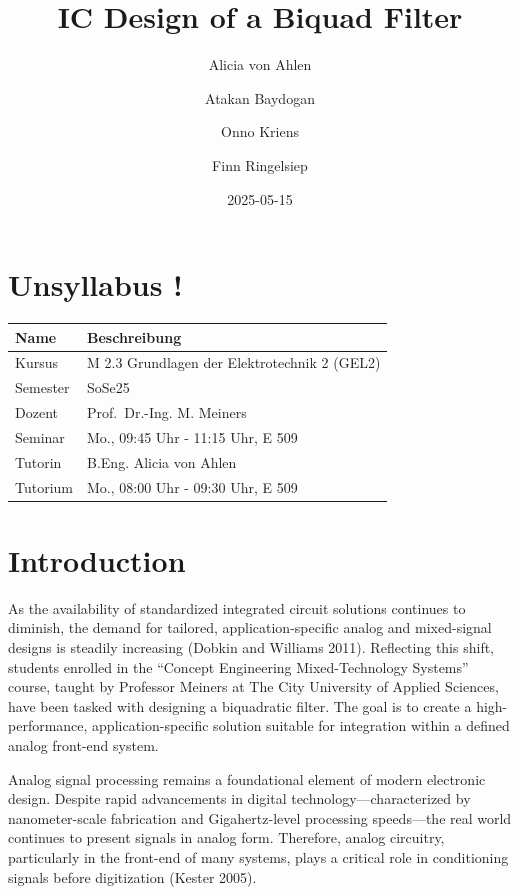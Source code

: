 \documentclass[
  english,
]{scrbook}
\title{IC Design of a Biquad Filter}
\author{Alicia von Ahlen \and Atakan Baydogan \and Onno Kriens \and Finn
Ringelsiep}
\date{2025-05-15}
\renewcommand*\contentsname{Table of contents}
\newcommand\contentsname{Table of contents}
\begin{document}
\frontmatter
\maketitle

\renewcommand*\contentsname{Table of contents}
{
\hypersetup{linkcolor=}
\setcounter{tocdepth}{2}
\tableofcontents
}

\mainmatter
\chapter{Unsyllabus !}\label{unsyllabus}

\begin{longtable}[]{@{}ll@{}}
\toprule\noalign{}
Name & Beschreibung \\
\midrule\noalign{}
\endhead
\bottomrule\noalign{}
\endlastfoot
Kursus & M 2.3 Grundlagen der Elektrotechnik 2 (GEL2) \\
Semester & SoSe25 \\
Dozent & Prof.~Dr.-Ing. M. Meiners \\
Seminar & Mo., 09:45 Uhr - 11:15 Uhr, E 509 \\
Tutorin & B.Eng. Alicia von Ahlen \\
Tutorium & Mo., 08:00 Uhr - 09:30 Uhr, E 509 \\
\end{longtable}

\chapter{Introduction}\label{introduction}

As the availability of standardized integrated circuit solutions
continues to diminish, the demand for tailored, application-specific
analog and mixed-signal designs is steadily increasing (Dobkin and
Williams 2011). Reflecting this shift, students enrolled in the
``Concept Engineering Mixed-Technology Systems'' course, taught by
Professor Meiners at The City University of Applied Sciences, have been
tasked with designing a biquadratic filter. The goal is to create a
high-performance, application-specific solution suitable for integration
within a defined analog front-end system.

Analog signal processing remains a foundational element of modern
electronic design. Despite rapid advancements in digital
technology---characterized by nanometer-scale fabrication and
Gigahertz-level processing speeds---the real world continues to present
signals in analog form. Therefore, analog circuitry, particularly in the
front-end of many systems, plays a critical role in conditioning signals
before digitization (Kester 2005).
\end{document}
